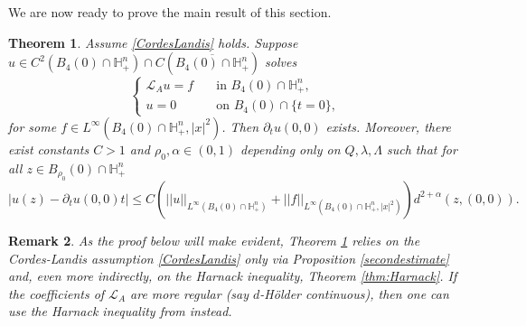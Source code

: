 \documentclass[12pt]{amsart}
\newtheorem{Theorem}{Theorem}[section]
\newtheorem{Remark}[Theorem]{Remark}
\newcommand{\Lop}{\mathcal{L}}
\def \H {{\mathbb H}}
\def \L {\mathcal{L}}
\def \a {\alpha}
\begin{document}
We are now ready to prove the main result of this section.

\begin{Theorem}\label{ScaleInvariantHolderEstimateNormalDerivative}
Assume \eqref{CordesLandis} holds. Suppose $u \in C^2(B_{4}(0)\cap \H^n_+) \cap C(\overline{B_{4}(0)\cap \H^n_+})$ solves
\[
\begin{cases}
\Lop_A u = f & \quad \text{in } B_{4}(0)\cap \H^n_+, \\
u = 0 & \quad \text{on } B_{4}(0)\cap \{t=0\},
\end{cases}
\]
for some $f \in L^{\infty}(B_{4}(0)\cap \H^n_+,|x|^2)$. Then $\partial_t u(0,0)$ exists. Moreover, there exist constants $C > 1$ and $\rho_0, \a \in(0,1)$ depending only on $Q, \lambda, \Lambda$ such that for all $z \in B_{\rho_0}(0)\cap \H^n_+$
\[
|u(z) - \partial_t u(0,0) t| \leq C\left( ||u||_{L^{\infty}(B_{4}(0)\cap \H^n_+)}  + ||f||_{L^{\infty}(B_{4}(0)\cap \H^n_+,|x|^{2})} \right) d^{2+\alpha}(z,(0,0)).
\]
\end{Theorem}

\begin{Remark}
As the proof below will make evident, Theorem \ref{ScaleInvariantHolderEstimateNormalDerivative} relies on the Cordes-Landis assumption \eqref{CordesLandis} only via Proposition \ref{secondestimate} and, even more indirectly, on the Harnack inequality, Theorem \ref{thm:Harnack}. If the coefficients of $\L_A$ are more regular (say $d$-H\"older continuous), then one can use the Harnack inequality from \cite{Bonfiglioli-Uguzzoni-07} instead.
\end{Remark}
\end{document}
